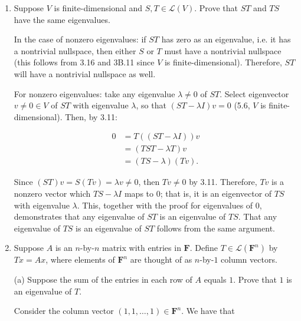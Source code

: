 \documentclass{book}
\begin{document}
\begin{enumerate}
\item Suppose \(V\) is finite-dimensional and \(S,T \in \mathcal{L}(V)\).  Prove that \(ST\) and \(TS\) have the same eigenvalues.

In the case of nonzero eigenvalues: if \(ST\) has zero as an eigenvalue, i.e. it has a nontrivial nullspace, then either \(S\) or \(T\) must have a nontrivial nullspace (this follows from 3.16 and 3B.11 since \(V\) is finite-dimensional).  Therefore, \(ST\) will have a nontrivial nullspace as well.

For nonzero eigenvalues: take any eigenvalue \(\lambda \neq 0\) of \(ST\).  Select eigenvector \(v \neq 0 \in V\) of \(ST\) with eigenvalue \(\lambda\), so that \((ST- \lambda I)v = 0\) (5.6, \(V\) is finite-dimensional).  Then, by 3.11:

\begin{equation*}
    \begin{split}
        0 &= T((ST-\lambda I))v \\
        &= (TST-\lambda T)v \\
        &= (TS-\lambda)(Tv).
    \end{split}
\end{equation*}

Since \((ST)v=S(Tv)=\lambda v \neq 0\), then \(Tv \neq 0\) by 3.11.  Therefore, \(Tv\) is a nonzero vector which \(TS-\lambda I\) maps to \(0\); that is, it is an eigenvector of \(TS\) with eigenvalue \(\lambda\).  This, together with the proof for eigenvalues of \(0\), demonstrates that any eigenvalue of \(ST\) is an eigenvalue of \(TS\).  That any eigenvalue of \(TS\) is an eigenvalue of \(ST\) follows from the same argument.

\item Suppose \(A\) is an \(n\)-by-\(n\) matrix with entries in \(\textbf{F}\).  Define \(T \in \mathcal{L}(\textbf{F}^n)\) by \(Tx=Ax\), where elements of \(\textbf{F}^n\) are thought of as \(n\)-by-\(1\) column vectors.

(a) Suppose the sum of the entries in each row of \(A\) equals \(1\).  Prove that \(1\) is an eigenvalue of \(T\).

Consider the column vector \((1,1,\dots,1) \in \textbf{F}^n\).  We have that


\end{enumerate}
\end{document}
